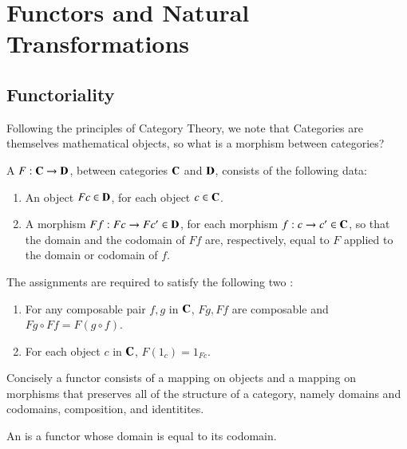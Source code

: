 \documentclass[12pt, a4paper, oneside, openright, titlepage]{book}
\begin{document}
\chapter{Functors and Natural Transformations}


\section{Functoriality}

Following the principles of Category Theory, we note that Categories are themselves mathematical objects, so what is a morphism between categories?

\begin{defn}
    A  $F:\normalfont\textbf{C}\rightarrow\normalfont\textbf{D}$, between categories $\normalfont\textbf{C}$ and $\normalfont\textbf{D}$, consists of the following data:\begin{enumerate}
        \item An object $Fc \in \normalfont\textbf{D}$, for each object $c \in \normalfont\textbf{C}$.
        \item A morphism $Ff:Fc\rightarrow Fc' \in \normalfont\textbf{D}$, for each morphism $f:c\rightarrow c' \in \normalfont\textbf{C}$, so that the domain and the codomain of $Ff$ are, respectively, equal to $F$ applied to the domain or codomain of $f$.
    \end{enumerate}
    The assignments are required to satisfy the following two : \begin{enumerate}
        \item For any composable pair $f,g$ in $\normalfont\textbf{C}$, $Fg,Ff$ are composable and $Fg\circ Ff = F(g\circ f)$.
        \item For each object $c$ in $\normalfont\textbf{C}$, $F(1_c) = 1_{Fc}$.
    \end{enumerate}
\end{defn}

Concisely a functor consists of a mapping on objects and a mapping on morphisms that preserves all of the structure of a category, namely domains and codomains, composition, and identitites.

\begin{defn}
    An  is a functor whose domain is equal to its codomain.
\end{defn}
\end{document}
